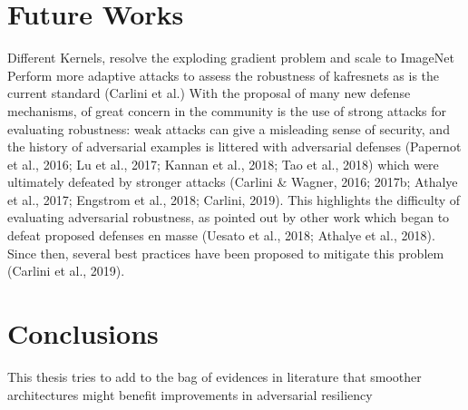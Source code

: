 \documentclass[LaM,binding=0.6cm]{./packages/sapthesis/sapthesis}
\begin{document}
\chapter{Future Works}

    Different Kernels, resolve the exploding gradient problem and scale to ImageNet
    Perform more adaptive attacks to assess the robustness of kafresnets as is the current standard (Carlini et al.)
    With the proposal of many new defense mechanisms, of great concern in the community is the use
    of strong attacks for evaluating robustness: weak attacks can give a misleading sense of security, and
    the history of adversarial examples is littered with adversarial defenses (Papernot et al., 2016; Lu
    et al., 2017; Kannan et al., 2018; Tao et al., 2018) which were ultimately defeated by stronger attacks
    (Carlini \& Wagner, 2016; 2017b; Athalye et al., 2017; Engstrom et al., 2018; Carlini, 2019). This
    highlights the difficulty of evaluating adversarial robustness, as pointed out by other work which
    began to defeat proposed defenses en masse (Uesato et al., 2018; Athalye et al., 2018). Since then,
    several best practices have been proposed to mitigate this problem (Carlini et al., 2019).


\chapter{Conclusions}

    This thesis tries to add to the bag of evidences in literature that smoother architectures might benefit improvements in adversarial resiliency
    
    
\appendix


\backmatter
\end{document}
